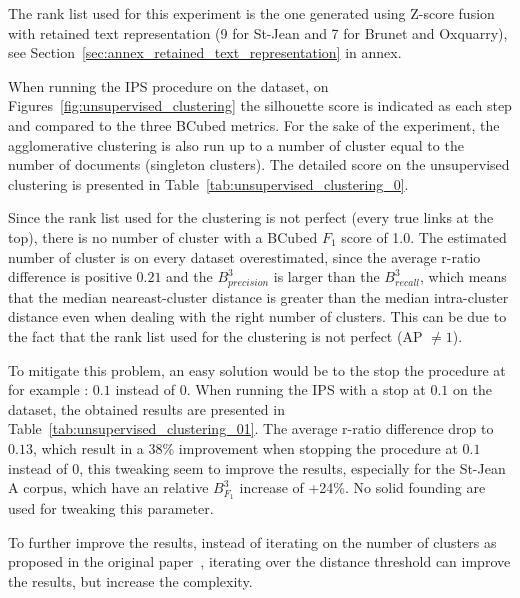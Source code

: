 The rank list used for this experiment is the one generated using Z-score fusion with retained text representation (9 for St-Jean and 7 for Brunet and Oxquarry), see Section~\ref{sec:annex_retained_text_representation} in annex.

When running the IPS procedure on the dataset, on Figures~\ref{fig:unsupervised_clustering} the silhouette score is indicated as each step and compared to the three BCubed metrics.
For the sake of the experiment, the agglomerative clustering is also run up to a number of cluster equal to the number of documents (singleton clusters).
The detailed score on the unsupervised clustering is presented in Table~\ref{tab:unsupervised_clustering_0}.

Since the rank list used for the clustering is not perfect (every true links at the top), there is no number of cluster with a BCubed $F_1$ score of 1.0.
The estimated number of cluster is on every dataset overestimated, since the average r-ratio difference is positive $0.21$ and the $B^3_{precision}$ is larger than the $B^3_{recall}$, which means that the median neareast-cluster distance is greater than the median intra-cluster distance even when dealing with the right number of clusters.
This can be due to the fact that the rank list used for the clustering is not perfect (AP $\neq 1$).

To mitigate this problem, an easy solution would be to the stop the procedure at for example : $0.1$ instead of $0$.
When running the IPS with a stop at $0.1$ on the dataset, the obtained results are presented in Table~\ref{tab:unsupervised_clustering_01}.
The average r-ratio difference drop to $0.13$, which result in a 38\% improvement when stopping the procedure at $0.1$ instead of $0$, this tweaking seem to improve the results, especially for the St-Jean A corpus, which have an relative $B^3_{F_1}$ increase of +24\%.
No solid founding are used for tweaking this parameter.

To further improve the results, instead of iterating on the number of clusters as proposed in the original paper~\cite{automated_unsupervised}, iterating over the distance threshold can improve the results, but increase the complexity.

